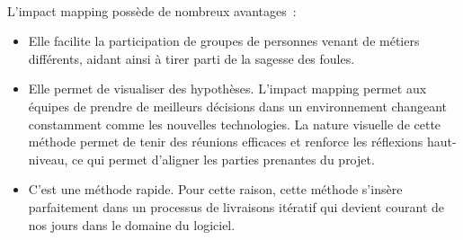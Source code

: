 \paragraph{}L'impact mapping possède de nombreux avantages~:
	\begin{itemize}
	    \item Elle facilite la participation de groupes de personnes venant de métiers différents, aidant ainsi à tirer parti de la sagesse des foules.
	    \item Elle permet de visualiser des hypothèses. L'impact mapping permet aux équipes de prendre de meilleurs décisions dans un environnement changeant constamment comme les nouvelles technologies. La nature visuelle de cette méthode permet de tenir des réunions efficaces et renforce les réflexions haut-niveau, ce qui permet d'aligner les parties prenantes du projet.
	    \item C'est une méthode rapide. Pour cette raison, cette méthode s'insère parfaitement dans un processus de livraisons itératif qui devient courant de nos jours dans le domaine du logiciel.
	\end{itemize}
	

